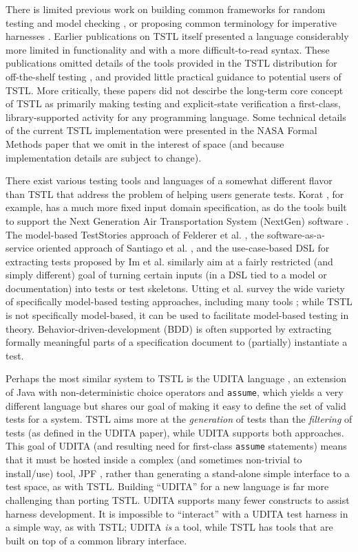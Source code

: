 There is limited previous work on
building common frameworks for random testing and model checking
\cite{woda08}, or proposing common terminology for imperative
harnesses \cite{woda12}.  Earlier publications on TSTL itself \cite{NFM15,ISSTA15} presented a
language considerably more limited in functionality and with a more
difficult-to-read syntax.  These publications omitted details of the tools provided in the TSTL distribution for
off-the-shelf testing \cite{tstl}, and provided little practical
guidance to potential users of TSTL.  More critically, these papers
did not descirbe the long-term core concept of TSTL as primarily
making testing and explicit-state verification
a first-class, library-supported activity for any programming
language.  Some technical
details of the current TSTL implementation were presented in the NASA
Formal Methods paper \cite{NFM15} that we omit in
the interest of space (and because implementation details are subject
to change).

There exist various testing tools and languages of a somewhat
different flavor than TSTL that address the problem of helping
users generate tests.   Korat \cite{Korat}, for example, has a much more fixed
input domain specification, as do the tools built to support the Next
Generation Air Transportation System (NextGen) software
\cite{TameInputs}. The model-based TestStories approach of Felderer et
al. \cite{TestStories}, the software-as-a-service oriented approach of
Santiago et al. \cite{Santiago}, and the use-case-based DSL for extracting tests
proposed by Im et al. \cite{AutoDSL} similarly aim at a fairly
restricted (and simply different) goal of turning certain inputs (in a DSL tied to a model or
documentation) into tests or test skeletons.  Utting et al. survey the wide variety of
specifically model-based testing approaches, including many tools
\cite{Taxonomy}; while TSTL is not specifically model-based, it can be
used to facilitate model-based testing in theory.
Behavior-driven-development (BDD) \cite{BDD} is often supported by extracting
formally meaningful parts of a specification document to (partially)
instantiate a test.  




Perhaps the most similar system to TSTL is the UDITA language
\cite{UDITA}, an extension of Java with non-deterministic choice
operators and {\tt assume}, which yields a very different language
but shares our goal of making it easy to define the set of valid
tests for a system.  TSTL aims more at the \emph{generation} of
tests than the \emph{filtering} of tests (as defined in the UDITA
paper), while UDITA supports both approaches.  This goal of UDITA (and
resulting need for first-class {\tt assume} statements) means that it
must be hosted inside a complex (and sometimes non-trivial to
install/use) tool, JPF \cite{JPF2}, rather than generating a
stand-alone simple interface to a test space, as with TSTL.  Building
``UDITA'' for a new language is far more challenging than porting
TSTL.  UDITA supports many fewer constructs to assist harness
development.  It is impossible to ``interact'' with a UDITA test
harness in a simple way, as with TSTL; UDITA \emph{is} a tool, while TSTL has
tools that are built on top of a common library interface.

